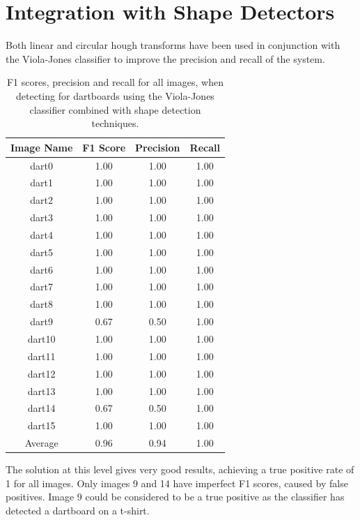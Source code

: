 \documentclass[conference]{IEEEtran}
\begin{document}
\clearpage
\section{Integration with Shape Detectors}
Both linear and circular hough transforms have been used in conjunction with the Viola-Jones classifier to improve the precision and recall of the system. 
\par
\begin{table}[htp]
\caption{F1 scores, precision and recall for all images, when detecting for dartboards using the Viola-Jones classifier combined with shape detection techniques. }
\begin{center}
\begin{tabular}{||c|c|c|c||}
\hline
Image Name		 	& F1 Score 	& Precision	& Recall            \\ \hline
dart0					& 1.00		&	1.00		& 1.00		\\
dart1					& 1.00		&	1.00		& 1.00		\\
dart2					& 1.00		&	1.00		& 1.00		\\
dart3					& 1.00		&	1.00		& 1.00		\\
dart4					& 1.00		&	1.00		& 1.00		\\
dart5					& 1.00		&	1.00		& 1.00		\\
dart6					& 1.00		&	1.00		& 1.00		\\
dart7					& 1.00		&	1.00		& 1.00		\\
dart8					& 1.00		&	1.00		& 1.00		\\
dart9					& 0.67		&	0.50		& 1.00		\\
dart10				& 1.00		&	1.00		& 1.00		\\
dart11				& 1.00		&	1.00		& 1.00		\\
dart12				& 1.00		&	1.00		& 1.00		\\
dart13				& 1.00		&	1.00		& 1.00		\\
dart14				& 0.67		&	0.50		& 1.00		\\
dart15				& 1.00		&	1.00		& 1.00		\\ \hline
Average 		 		& 0.96		&	0.94		& 1.00 		\\ \hline
\end{tabular}
\end{center}
\label{default}
\end{table}
\par
The solution at this level gives very good results, achieving a true positive rate of 1 for all images. Only images 9 and 14 have imperfect F1 scores, caused by false positives. Image 9 could be considered to be a true positive as the classifier has detected a dartboard on a t-shirt. 
\par
\end{document}
